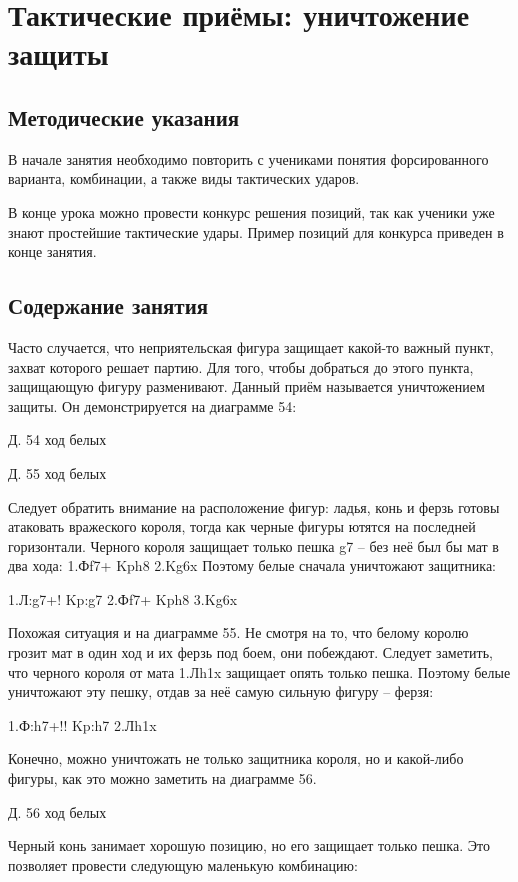 \chapter{Тактические приёмы: уничтожение защиты}

\section{Методические указания}

В начале занятия необходимо повторить с учениками понятия форсированного варианта, комбинации, а также виды тактических ударов. 

В конце урока можно провести конкурс решения позиций, так как ученики уже знают простейшие тактические удары. Пример позиций для конкурса приведен в конце занятия.

\section{Содержание занятия}

Часто случается, что неприятельская фигура защищает какой-то важный пункт, захват которого решает партию. Для того, чтобы добраться до этого пункта, защищающую фигуру разменивают. Данный приём называется уничтожением защиты. Он демонстрируется на диаграмме 54:
 
 
Д. 54 ход белых
 
Д. 55 ход белых
 
Следует обратить внимание на расположение фигур: ладья, конь и ферзь готовы атаковать вражеского короля, тогда как черные фигуры ютятся на последней горизонтали. Черного короля защищает только пешка g7 – без неё был бы мат в два хода: 1.Фf7+ Kph8 2.Kg6x Поэтому белые сначала уничтожают защитника:

1.Л:g7+! Kp:g7 2.Фf7+ Kph8 3.Kg6x

Похожая ситуация и на диаграмме 55. Не смотря на то, что белому королю грозит мат в один ход и их ферзь под боем, они побеждают. Следует заметить, что черного короля от мата 1.Лh1x защищает опять только пешка. Поэтому белые уничтожают эту пешку, отдав за неё самую сильную фигуру – ферзя:

1.Ф:h7+!! Kp:h7 2.Лh1x

Конечно, можно уничтожать не только защитника короля, но и какой-либо фигуры, как это можно заметить на диаграмме 56.
 
Д. 56 ход белых

Черный конь занимает хорошую позицию, но его защищает только пешка. Это позволяет провести следующую маленькую комбинацию:

